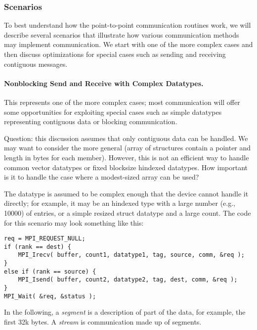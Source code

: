 \subsubsection{Scenarios}
\label{sec:pt-2-pt-scenarios}

To best understand how the point-to-point communication routines work, we will
describe several scenarios that illustrate how various communication methods
may implement communication.  We start with one of the more complex cases and
then discuss optimizations for special cases such as sending and receiving
contiguous messages.

\paragraph{Nonblocking Send and Receive with Complex Datatypes.}
This represents one of the more complex cases; most communication will offer
some opportunities for exploiting special cases such as simple datatypes
representing contiguous data or blocking communication.  

Question: this discussion assumes that only contiguous data can be handled.
We may want to consider the more general  (array of structures
contain a pointer and length in bytes for each member).  However, this is not
an efficient way to handle common vector datatypes or fixed blocksize hindexed
datatypes.  How important is it to handle the case where a modest-sized
 array can be used?  

The datatype is assumed to be complex enough that the device cannot handle it
directly; for example, it may be an hindexed type with a large number (e.g.,
10000) of entries, or a simple resized struct datatype and a large count.
The code for this scenario may look something like this:
\begin{verbatim}
req = MPI_REQUEST_NULL;
if (rank == dest) {
    MPI_Irecv( buffer, count1, datatype1, tag, source, comm, &req );
}
else if (rank == source) {
    MPI_Isend( buffer, count2, datatype2, tag, dest, comm, &req );
}
MPI_Wait( &req, &status );
\end{verbatim}

In the following, a \emph{segment} is a description of part of the data, for
example, the first 32k bytes.  A \emph{stream} is communication made up of
segments.

